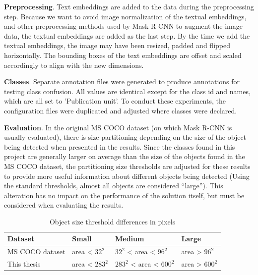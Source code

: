 \documentclass[oneside, english, bibtex]{kththesis}
\begin{document}
\textbf{Preprocessing}. Text embeddings are added to the data during the preprocessing step.
Because we want to avoid image normalization of the textual embeddings, and other preprocessing methods used by Mask R-CNN to augment the image data,
the textual embeddings are added as the last step. By the time we add the textual embeddings, the image may have been resized, padded and flipped horizontally.
The bounding boxes of the text embeddings are offset and scaled accordingly to align with the new dimensions.

\textbf{Classes}. Separate annotation files were generated to produce annotations for testing class confusion.
All values are identical except for the class id and names, which are all set to 'Publication unit'.
To conduct these experiments, the configuration files were duplicated and adjusted where classes were declared.

\textbf{Evaluation}. In the original MS COCO dataset (on which Mask R-CNN is usually evaluated),
there is size partitioning depending on the size of the object being detected when presented in the results.
Since the classes found in this project are generally larger on average than the size of the objects found in the MS COCO dataset,
the partitioning size thresholds are adjusted for these results to provide more useful information about different objects being detected (Using the standard thresholds, almost all objects are considered “large”).
This alteration has no impact on the performance of the solution itself, but must be considered when evaluating the results.

\begin{table}[H]
  \begin{center}
    \caption{Object size threshold differences in pixels}
    \label{tab:objectsizes}
    \begin{tabular}{l|l|l|l} %
    \textbf{Dataset} & \textbf{Small} & \textbf{Medium} & \textbf{Large}  \\
    \hline
    MS COCO dataset & area < $32^2$ & $32^2$ < area < $96^2$ & area > $96^2$  \\    \hline
    This thesis & area < $283^2$ & $283^2$ < area < $600^2$ & area > $600^2$ \\    \hline
    \end{tabular}
  \end{center}
\end{table}
\end{document}
